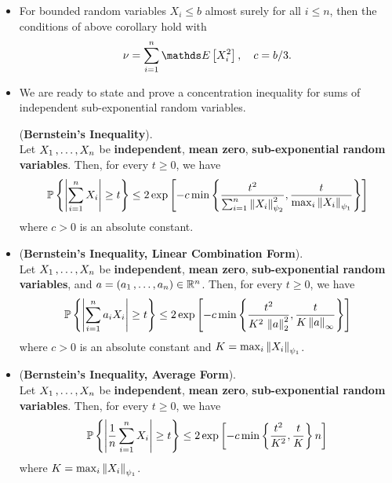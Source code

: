 \documentclass[11pt]{article}
\begin{document}
\begin{itemize}
\item \begin{remark}
For bounded random variables $X_i \le b$ almost surely for all $i \le n$, then the conditions of above corollary hold with
\begin{align*}
\nu = \sum_{i=1}^{n}\E{}{X_i^2}, \quad c = b/3.
\end{align*}
\end{remark}


\item We are ready to state and prove a concentration inequality for sums of independent sub-exponential random variables.
\begin{proposition} (\textbf{Bernstein's Inequality}).  \citep{vershynin2018high}\\
Let $X_1 \,{,}\ldots{,}\, X_n$ be \textbf{independent}, \textbf{mean zero}, \textbf{sub-exponential random variables}. Then, for every $t \ge 0$, we have
\begin{align}
{\mathbb P}\left\{\left\lvert \sum_{i=1}^{n}X_i \right\rvert \ge t\right\} \le 2 \exp\left[- c \min\left\{\frac{t^2}{\sum_{i=1}^{n}\left\|X_i\right\|_{\psi_2}^2},  \frac{t}{\max_i \left\|X_i\right\|_{\psi_1}}\right\}\right] \label{ineqn: bernstein_inequality}
\end{align}
where $c > 0$ is an absolute constant.
\end{proposition}

\item 
\begin{proposition} (\textbf{Bernstein's Inequality, Linear Combination Form}).  \citep{vershynin2018high}\\
Let $X_1 \,{,}\ldots{,}\, X_n$ be \textbf{independent}, \textbf{mean zero}, \textbf{sub-exponential random variables}, and $a = (a_1 \,{,}\ldots{,}\, a_n) \in {\mathbb R}^n$. Then, for every $t \ge 0$, we have
\begin{align}
{\mathbb P}\left\{\left\lvert \sum_{i=1}^{n}a_i X_i \right\rvert \ge t\right\} \le 2 \exp\left[- c \min\left\{\frac{t^2}{K^2\, \left\|a\right\|_{2}^2},  \frac{t}{K \left\|a\right\|_{\infty}}\right\}\right] \label{ineqn: bernstein_inequality_linear_comb}
\end{align}
where $c > 0$ is an absolute constant and $K = \max_i \left\|X_i\right\|_{\psi_1}$.
\end{proposition}

\item \begin{corollary}(\textbf{Bernstein's Inequality, Average Form}).  \citep{vershynin2018high}\\
Let $X_1 \,{,}\ldots{,}\, X_n$ be \textbf{independent}, \textbf{mean zero}, \textbf{sub-exponential random variables}. Then, for every $t \ge 0$, we have
\begin{align}
{\mathbb P}\left\{\left\lvert \frac{1}{n}\sum_{i=1}^{n}X_i \right\rvert \ge t\right\} \le 2 \exp\left[- c \min\left\{\frac{t^2}{K^2},  \frac{t}{K}\right\}n\right] \label{ineqn: bernstein_inequality_average}
\end{align} where $K = \max_i \left\|X_i\right\|_{\psi_1}$.
\end{corollary}


\end{itemize}
\end{document}
